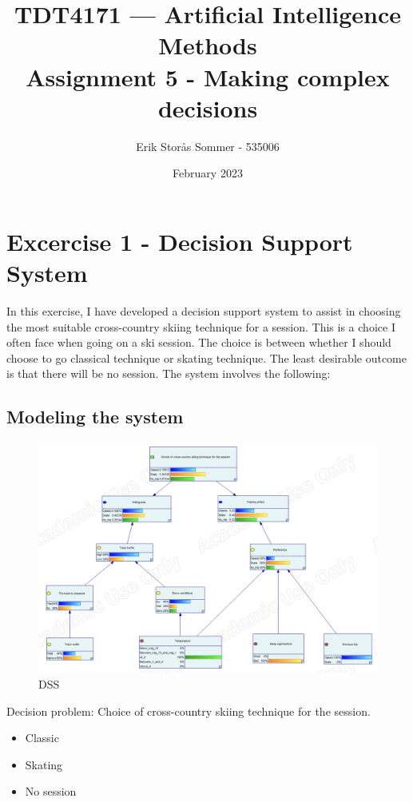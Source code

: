 \documentclass{article}
\title{TDT4171 — Artificial Intelligence Methods \\ Assignment 5 - Making complex decisions}
\author{Erik Storås Sommer - 535006}
\date{February 2023}
\begin{document}
\maketitle
\setlength{\parindent}{0pt}

\section*{Excercise 1 - Decision Support System}

In this exercise, I have developed a decision support system to assist in choosing the most suitable cross-country skiing technique for a session.
This is a choice I often face when going on a ski session.
The choice is between whether I should choose to go classical technique or skating technique. The least desirable outcome is that there will be no session.
The system involves the following:

\subsection*{Modeling the system}

\begin{figure}[hbtp]
    \includegraphics[width=\linewidth]{main_model.png}
    \caption{DSS}
    \label{fig:image1}
\end{figure}

Decision problem: Choice of cross-country skiing technique for the session.
\begin{itemize}
    \item Classic
    \item Skating
    \item No session
\end{itemize}
\end{document}
